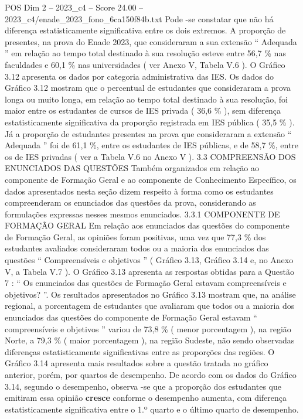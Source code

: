 \begin{textsample}{POS Dim 2 – 2023\_c4 – Score 24.00 – 2023\_c4/enade\_2023\_fono\_6ca150f84b.txt}
Pode -se constatar que não há diferença estatisticamente significativa entre os dois extremos.
A proporção de presentes, na prova do Enade 2023, que consideraram a sua extensão “ Adequada ” em relação ao tempo total destinado à sua resolução esteve entre 56,7 \% nas faculdades e 60,1 \% nas universidades ( ver Anexo V, Tabela V.6 ).
O Gráfico 3.12 apresenta os dados por categoria administrativa das IES.
Os dados do Gráfico 3.12 mostram que o percentual de estudantes que consideraram a prova longa ou muito longa, em relação ao tempo total destinado à sua resolução, foi maior entre os estudantes de cursos de IES privada ( 36,6 \% ), sem diferença estatisticamente significativa da proporção registrada em IES pública ( 35,5 \% ).
Já a proporção de estudantes presentes na prova que consideraram a extensão “ Adequada ” foi de 61,1 \%, entre os estudantes de IES públicas, e de 58,7 \%, entre os de IES privadas ( ver a Tabela V.6 no Anexo V ). 3.3 COMPREENSÃO DOS ENUNCIADOS DAS QUESTÕES Também organizados em relação ao componente de Formação Geral e ao componente de Conhecimento Específico, os dados apresentados nesta seção dizem respeito à forma como os estudantes compreenderam os enunciados das questões da prova, considerando as formulações expressas nesses mesmos enunciados. 3.3.1 COMPONENTE DE FORMAÇÃO GERAL Em relação aos enunciados das questões do componente de Formação Geral, as opiniões foram positivas, uma vez que 77,3 \% dos estudantes avaliados consideraram todos ou a maioria dos enunciados das questões “ Compreensíveis e objetivos ” ( Gráfico 3.13, Gráfico 3.14 e, no Anexo V, a Tabela V.7 ).
O Gráfico 3.13 apresenta as respostas obtidas para a Questão 7 : “ Os enunciados das questões de Formação Geral estavam compreensíveis e objetivos? ”.
Os resultados apresentados no Gráfico 3.13 mostram que, na análise regional, a porcentagem de estudantes que avaliaram que todos ou a maioria dos enunciados das questões do componente de Formação Geral estavam “ compreensíveis e objetivos ” variou de 73,8 \% ( menor porcentagem ), na região Norte, a 79,3 \% ( maior porcentagem ), na região Sudeste, não sendo observadas diferenças estatisticamente significativas entre as proporções das regiões.
O Gráfico 3.14 apresenta mais resultados sobre a questão tratada no gráfico anterior, porém, por quartos de desempenho.
De acordo com os dados do Gráfico 3.14, segundo o desempenho, observa -se que a proporção dos estudantes que emitiram essa opinião \textbf{cresce} conforme o desempenho aumenta, com diferença estatisticamente significativa entre o 1.º quarto e o último quarto de desempenho.

\end{textsample}
